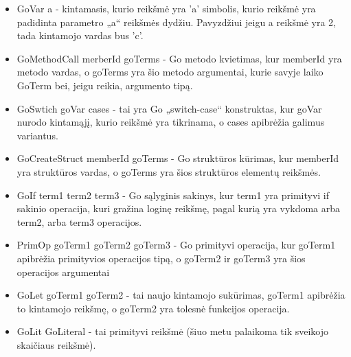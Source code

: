 \documentclass{VUMIFPSkursinis}
\begin{document}
	\begin{itemize}
		\item GoVar a - kintamasis, kurio reikšmė yra 'a' simbolis, kurio reikšmė yra padidinta parametro „a“ reikšmės dydžiu. Pavyzdžiui jeigu a reikšmė yra 2, tada kintamojo vardas bus 'c'.
		\item GoMethodCall merberId goTerms - Go metodo kvietimas, kur memberId yra metodo vardas, o goTerms yra šio metodo argumentai, kurie savyje laiko GoTerm bei, jeigu reikia, argumento tipą.
		\item GoSwtich goVar cases - tai yra Go „switch-case“ konstruktas, kur goVar nurodo kintamąjį, kurio reikšmė yra tikrinama, o cases apibrėžia galimus variantus.
		\item GoCreateStruct memberId goTerms - Go struktūros kūrimas, kur memberId yra struktūros vardas, o goTerms yra šios struktūros elementų reikšmės.
		\item GoIf term1 term2 term3 - Go sąlyginis sakinys, kur term1 yra primityvi if sakinio operacija, kuri gražina loginę reikšmę, pagal kurią yra vykdoma arba term2, arba term3 operacijos.
		\item PrimOp goTerm1 goTerm2 goTerm3 - Go primityvi operacija, kur goTerm1 apibrėžia primityvios operacijos tipą, o goTerm2 ir goTerm3 yra šios operacijos argumentai
		\item GoLet goTerm1 goTerm2 - tai naujo kintamojo sukūrimas, goTerm1 apibrėžia to kintamojo reikšmę, o goTerm2 yra tolesnė funkcijos operacija.
		\item GoLit GoLiteral - tai primityvi reikšmė (šiuo metu palaikoma tik sveikojo skaičiaus reikšmė).
	\end{itemize}
\end{document}
